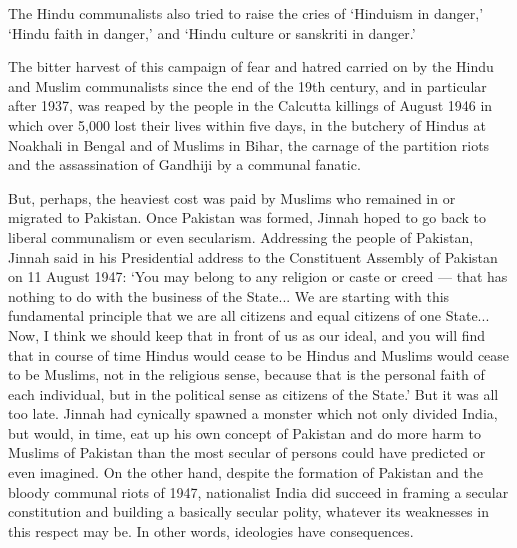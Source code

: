 The Hindu communalists also tried to raise the cries of `Hinduism in danger,' `Hindu faith in danger,' and `Hindu culture or sanskriti in danger.' 

The bitter harvest of this campaign of fear and hatred carried on by the Hindu and Muslim communalists since the end of the 19th century, and in particular after 1937, was reaped by the people in the Calcutta killings of August 1946 in which over 5,000 lost their lives within five days, in the butchery of Hindus at Noakhali in Bengal and of Muslims in Bihar, the carnage of the partition riots and the assassination of Gandhiji by a communal fanatic. 

But, perhaps, the heaviest cost was paid by Muslims who remained in or migrated to Pakistan. Once Pakistan was formed, Jinnah hoped to go back to liberal communalism or even secularism. Addressing the people of Pakistan, Jinnah said in his Presidential address to the Constituent Assembly of Pakistan on 11 August 1947: `You may belong to any religion or caste or creed — that has nothing to do with the business of the State... We are starting with this fundamental principle that we are all citizens and equal citizens of one State... Now, I think we should keep that in front of us as our ideal, and you will find that in course of time Hindus would cease to be Hindus and Muslims would cease to be Muslims, not in the religious sense, because that is the personal faith of each individual, but in the political sense as citizens of the State.' But it was all too late. Jinnah had cynically spawned a monster which not only divided India, but would, in time, eat up his own concept of Pakistan and do more harm to Muslims of Pakistan than the most secular of persons could have predicted or even imagined. On the other hand, despite the formation of Pakistan and the bloody communal riots of 1947, nationalist India did succeed in framing a secular constitution and building a basically secular polity, whatever its weaknesses in this respect may be. In other words, ideologies have consequences. 

